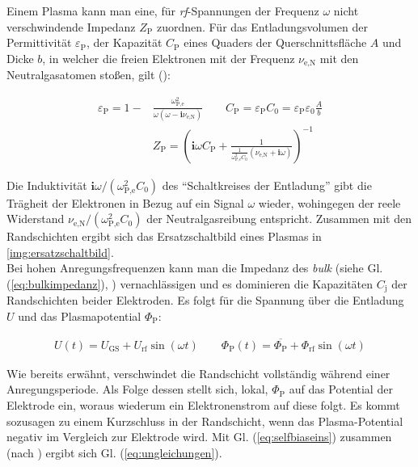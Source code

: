 \documentclass[numbers=noenddot,a4paper,notitlepage,twoside,BCOR15mm]{scrbook}
\newcommand{\ix}[1]{_\text{#1}}
\newcommand{\imag}{\mathbf{i}}
\newcommand{\tilt}[1]{\textit{#1}}
\begin{document}
					Einem Plasma kann man eine, für \tilt{rf}-Spannungen der Frequenz $\omega$ nicht verschwindende Impedanz $Z\ix{P}$ zuordnen. Für das Entladungsvolumen der Permittivität $\varepsilon\ix{P}$, der Kapazität $C\ix{P}$ eines Quaders der Querschnittsfläche $A$ und Dicke $b$, in welcher die freien Elektronen mit der Frequenz $\nu\ix{e,N}$ mit den Neutralgasatomen stoßen, gilt (\cite{Piel10}):

					\begin{align}
					\varepsilon\ix{P}=1-&\frac{\omega\ix{P,e}^2}{\omega\left(\omega-\imag\nu\ix{e,N}\right)} \quad \quad C\ix{P}=\varepsilon\ix{P}C\ix{0}=\varepsilon\ix{P}\varepsilon\ix{0}\frac{A}{b} \\
					&Z\ix{P}=\left(\imag\omega C\ix{P}+ \frac{1}{\frac{1}{\omega\ix{P,e}^2C\ix{0}}\left(\nu\ix{e,N}+\imag\omega\right)}\right)^{-1}
					\label{eq:bulkimpedanz}
					\end{align}

					Die Induktivität $\imag\omega/\left(\omega\ix{P,e}^2C\ix{0}\right)$ des "`Schaltkreises der Entladung"' gibt die Trägheit der Elektronen in Bezug auf ein Signal $\omega$ wieder, wohingegen der reele Widerstand $\nu\ix{e,N}/\left(\omega\ix{P,e}^2C\ix{0}\right)$ der Neutralgasreibung entspricht. Zusammen mit den Randschichten ergibt sich das Ersatzschaltbild eines Plasmas in \ref{img:ersatzschaltbild}.\\
					Bei hohen Anregungsfrequenzen kann man die Impedanz des \tilt{bulk} (siehe Gl. (\ref{eq:bulkimpedanz}), \cite{Kay85}) vernachlässigen und es dominieren die Kapazitäten $C\ix{j}$ der Randschichten beider Elektroden. Es folgt für die Spannung über die Entladung $U$ und das Plasmapotential $\Phi\ix{P}$:

						\begin{align}
							U\left(t\right)=U\ix{GS}+U\ix{rf}\sin\left(\omega t\right) \quad \quad \Phi\ix{P}\left(t\right)=\overline{\Phi\ix{P}}+\Phi\ix{rf}\sin\left(\omega t\right) \label{eq:selfbiaseins}
						\end{align}

					Wie bereits erwähnt, verschwindet die Randschicht vollständig während einer Anregungsperiode. Als Folge dessen stellt sich, lokal, $\Phi\ix{P}$ auf das Potential der Elektrode ein, woraus wiederum ein Elektronenstrom auf diese folgt. Es kommt sozusagen zu einem Kurzschluss in der Randschicht, wenn das Plasma-Potential negativ im Vergleich zur Elektrode wird. Mit Gl. (\ref{eq:selfbiaseins}) zusammen (nach \cite{Piel10}) ergibt sich Gl. (\ref{eq:ungleichungen}).
\end{document}
